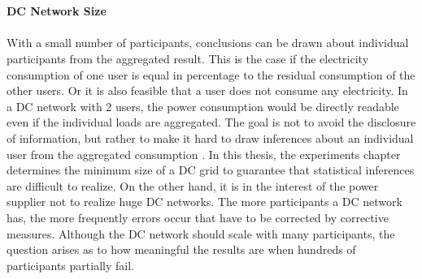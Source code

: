 \\
\\
\textbf{DC Network Size}
\\
\\
With a small number of participants, conclusions can be drawn about individual participants from the aggregated result. This is the case if the electricity consumption of one user is equal in percentage to the residual consumption of the other users. Or it is also feasible that a user does not consume any electricity. In a DC network with 2 users, the power consumption would be directly readable even if the individual loads are aggregated. The goal is not to avoid the disclosure of information, but rather to make it hard to draw inferences about an individual user from the aggregated consumption \cite{le2020differential}.
In this thesis, the experiments chapter determines the minimum size of a DC grid to guarantee that statistical inferences are difficult to realize.
On the other hand, it is in the interest of the power supplier not to realize huge DC networks. The more participants a DC network has, the more frequently errors occur that have to be corrected by corrective measures. Although the DC network should scale with many participants, the question arises as to how meaningful the results are when hundreds of participants partially fail.%




